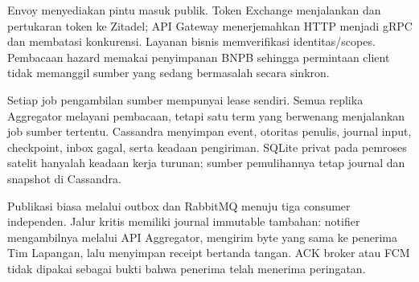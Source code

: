 Envoy menyediakan pintu masuk publik. Token Exchange menjalankan  dan pertukaran token ke Zitadel; API Gateway menerjemahkan HTTP menjadi gRPC dan membatasi konkurensi. Layanan bisnis memverifikasi identitas/scopes. Pembacaan hazard memakai penyimpanan BNPB sehingga permintaan client tidak memanggil sumber yang sedang bermasalah secara sinkron.

Setiap job pengambilan sumber mempunyai lease sendiri. Semua replika Aggregator melayani pembacaan, tetapi satu term yang berwenang menjalankan job sumber tertentu. Cassandra menyimpan event, otoritas penulis, journal input, checkpoint, inbox gagal, serta keadaan pengiriman. SQLite privat pada pemroses satelit hanyalah keadaan kerja turunan; sumber pemulihannya tetap journal dan snapshot di Cassandra.

Publikasi biasa melalui outbox dan RabbitMQ menuju tiga consumer independen. Jalur kritis memiliki journal immutable tambahan: notifier mengambilnya melalui API Aggregator, mengirim byte yang sama ke penerima Tim Lapangan, lalu menyimpan receipt bertanda tangan. ACK broker atau FCM tidak dipakai sebagai bukti bahwa penerima telah menerima peringatan.


